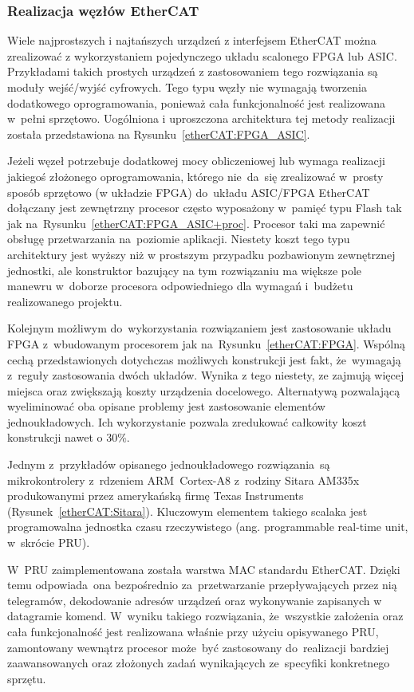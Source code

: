 \subsubsection{Realizacja węzłów EtherCAT}
Wiele najprostszych i najtańszych urządzeń z interfejsem EtherCAT można zrealizować z wykorzystaniem pojedynczego układu scalonego FPGA lub ASIC. Przykładami takich prostych urządzeń z zastosowaniem tego rozwiązania są moduły wejść/wyjść cyfrowych. Tego typu węzły nie wymagają tworzenia dodatkowego oprogramowania, ponieważ cała funkcjonalność jest realizowana w~pełni sprzętowo. Uogólniona i uproszczona architektura tej metody realizacji została przedstawiona na Rysunku~\ref{etherCAT:FPGA_ASIC}.

Jeżeli węzeł potrzebuje dodatkowej mocy obliczeniowej lub wymaga realizacji jakiegoś złożonego oprogramowania, którego nie~da~się zrealizować w~prosty sposób sprzętowo (w układzie FPGA) do~układu ASIC/FPGA EtherCAT dołączany jest zewnętrzny procesor często wyposażony w~pamięć typu Flash tak jak na~Rysunku~\ref{etherCAT:FPGA_ASIC+proc}. Procesor taki ma zapewnić obsługę przetwarzania na~poziomie aplikacji. Niestety koszt tego typu architektury jest wyższy niż w prostszym przypadku pozbawionym zewnętrznej jednostki, ale konstruktor bazujący na tym rozwiązaniu ma większe pole manewru w~doborze procesora odpowiedniego dla wymagań i~budżetu realizowanego projektu.

Kolejnym możliwym do~wykorzystania rozwiązaniem jest zastosowanie układu FPGA z~wbudowanym procesorem jak na~Rysunku~\ref{etherCAT:FPGA}. Wspólną cechą przedstawionych dotychczas możliwych konstrukcji jest fakt, że~wymagają z~reguły zastosowania dwóch układów. Wynika z tego niestety, ze zajmują więcej miejsca oraz zwiększają koszty urządzenia docelowego. Alternatywą pozwalającą wyeliminować oba opisane problemy jest zastosowanie elementów jednoukładowych. Ich wykorzystanie pozwala zredukować całkowity koszt konstrukcji nawet o 30\%.

Jednym z~przykładów opisanego jednoukładowego rozwiązania~są mikrokontrolery z~rdzeniem ARM~Cortex-A8 z~rodziny Sitara AM335x produkowanymi przez amerykańską firmę Texas Instruments (Rysunek~\ref{etherCAT:Sitara}). Kluczowym elementem takiego scalaka jest programowalna jednostka czasu rzeczywistego (ang. programmable real-time unit, w~skrócie PRU). 

W~PRU zaimplementowana została warstwa MAC standardu EtherCAT. Dzięki temu odpowiada~ona bezpośrednio za~przetwarzanie przepływających przez nią telegramów, dekodowanie adresów urządzeń oraz wykonywanie zapisanych w datagramie komend. W~wyniku takiego rozwiązania, że~wszystkie założenia oraz cała funkcjonalność jest realizowana właśnie przy użyciu opisywanego PRU, zamontowany wewnątrz procesor może~być zastosowany do~realizacji bardziej zaawansowanych oraz złożonych zadań wynikających ze~specyfiki konkretnego sprzętu.

